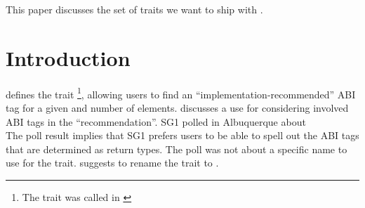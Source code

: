 \newcommand\wgTitle{Finding the right set of traits for \code{simd<T>}}
\newcommand\wgName{Matthias Kretz <m.kretz@gsi.de>}
\newcommand\wgDocumentNumber{D0964R1}
\newcommand\wgGroup{SG1, LEWG}

\usepackage{mymacros}
\usepackage{wg21}
\usepackage{underscore}



\newcommand\simd[1][]{\type{simd#1}\xspace}
\newcommand\simdT{\type{simd<T>}\xspace}
\newcommand\valuetype{\type{value\_type}\xspace}
\newcommand\referencetype{\type{reference}\xspace}
\newcommand\whereexpression{\type{where\_expression}\xspace}
\newcommand\simdcast{\code{simd\_cast}\xspace}
\newcommand\mask[1][]{\type{simd\_mask#1}\xspace}
\newcommand\maskT{\type{simd\_mask<T>}\xspace}
\newcommand\fixedsizeN{\type{simd\_abi::fixed\_size<N>}\xspace}
\newcommand\fixedsizescoped{\type{simd\_abi::fixed\_size}\xspace}
\newcommand\fixedsize{\type{fixed\_size}\xspace}
\newcommand\simdEP{\code{execution::}\type{simd}\xspace}
\newcommand\seqEP{\code{execution::}\type{seq}\xspace}
\newcommand\realArithmeticType{vectorizable type\xspace}

\usepackage{pifont}

\newcommand\foralli[1][]{for all \code i $\in$ \code{[0, #1size())}\xspace}
\newcommand\forallmaskedi[1]{%
  for all \code i
  $\in \{j \in \mathbb{N}_0 | j < \code{size()} ⋀ \code{#1[}j\code{]}\}$%
  \xspace%
}
\newcommand\chck{\item[\color{black}\ensuremath{\checkmark}]}
\newcommand\todo{\item[\color{black}\ding{46}] \color{gray}}
\newcommand\itemheader[1]{\item[] \hfill \textcolor{gray}{\textsc{#1}}}


\begin{wgTitlepage}
  This paper discusses the set of traits we want to ship with \simdT.
\end{wgTitlepage}

\pagestyle{scrheadings}
\section{Introduction}
\textcite{P0214R9} defines the trait \footnote{The trait was called  in \textcite{P0214R8}}, allowing users to find an “implementation-recommended” ABI tag for a given \valuetype and number of elements.
\textcite{P0820R1} discusses a use for considering involved ABI tags in the “recommendation”.
SG1 polled in Albuquerque about\\
\noindent The poll result implies that SG1 prefers users to be able to spell out the ABI tags that are determined as return types.
The poll was not about a specific name to use for the trait.
\textcite{P0820R1} suggests to rename the trait to .

